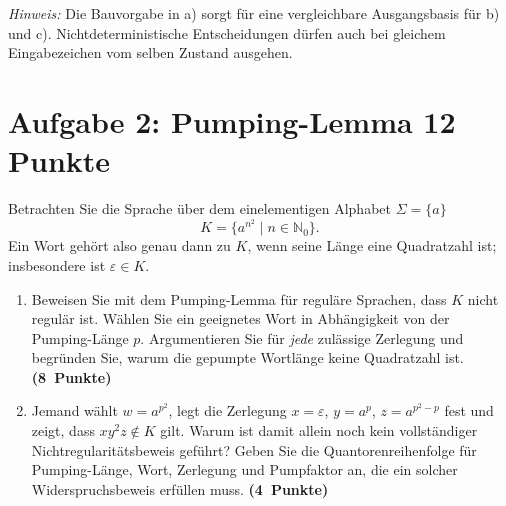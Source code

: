 \documentclass[11pt,a4paper]{article}
\newcommand{\punkte}[1]{\hfill\mbox{\textbf{(#1 Punkte)}}}
\begin{document}
\textit{Hinweis:} Die Bauvorgabe in a) sorgt für eine vergleichbare Ausgangsbasis
für b) und c). Nichtdeterministische Entscheidungen dürfen auch bei
gleichem Eingabezeichen vom selben Zustand ausgehen.

\newpage
\section*{Aufgabe 2: Pumping-Lemma \hfill 12 Punkte}
Betrachten Sie die Sprache über dem einelementigen Alphabet $\Sigma=\{a\}$
\[
 K=\{a^{n^2}\mid n\in\mathbb N_0\}.
\]
Ein Wort gehört also genau dann zu $K$, wenn seine Länge eine Quadratzahl
ist; insbesondere ist $\varepsilon\in K$.
\begin{enumerate}[label=\alph*)]
\item Beweisen Sie mit dem Pumping-Lemma für reguläre Sprachen, dass $K$
nicht regulär ist. Wählen Sie ein geeignetes Wort in Abhängigkeit von der
Pumping-Länge $p$. Argumentieren Sie für \emph{jede} zulässige Zerlegung
und begründen Sie, warum die gepumpte Wortlänge keine Quadratzahl ist.
\punkte{8}
\item Jemand wählt $w=a^{p^2}$, legt die Zerlegung
$x=\varepsilon$, $y=a^p$, $z=a^{p^2-p}$ fest und zeigt, dass
$xy^2z\notin K$ gilt. Warum ist damit allein noch kein vollständiger
Nichtregularitätsbeweis geführt? Geben Sie die Quantorenreihenfolge für
Pumping-Länge, Wort, Zerlegung und Pumpfaktor an, die ein solcher
Widerspruchsbeweis erfüllen muss. \punkte{4}
\end{enumerate}
\end{document}
